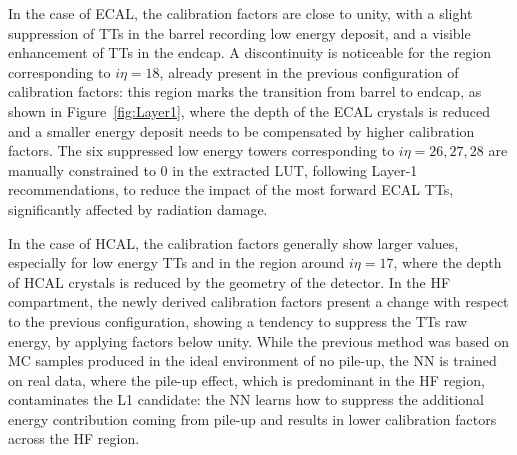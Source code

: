 In the case of ECAL, the calibration factors are close to unity, with a slight suppression of TTs in the barrel recording low energy deposit, and a visible enhancement of TTs in the endcap. A discontinuity is noticeable for the region corresponding to $i\eta=18$, already present in the previous configuration of calibration factors: this region marks the transition from barrel to endcap, as shown in Figure~\ref{fig:Layer1}, where the depth of the ECAL crystals is reduced and a smaller energy deposit needs to be compensated by higher calibration factors. The six suppressed low energy towers corresponding to $i\eta=26,27,28$ are manually constrained to 0 in the extracted LUT, following Layer-1 recommendations, to reduce the impact of the most forward ECAL TTs, significantly affected by radiation damage.

In the case of HCAL, the calibration factors generally show larger values, especially for low energy TTs and in the region around $i\eta=17$, where the depth of HCAL crystals is reduced by the geometry of the detector. In the HF compartment, the newly derived calibration factors present a change with respect to the previous configuration, showing a tendency to suppress the TTs raw energy, by applying factors below unity. While the previous method was based on MC samples produced in the ideal environment of no pile-up, the NN is trained on real data, where the pile-up effect, which is predominant in the HF region, contaminates the L1 candidate: the NN learns how to suppress the additional energy contribution coming from pile-up and results in lower calibration factors across the HF region.

\bigbreak

